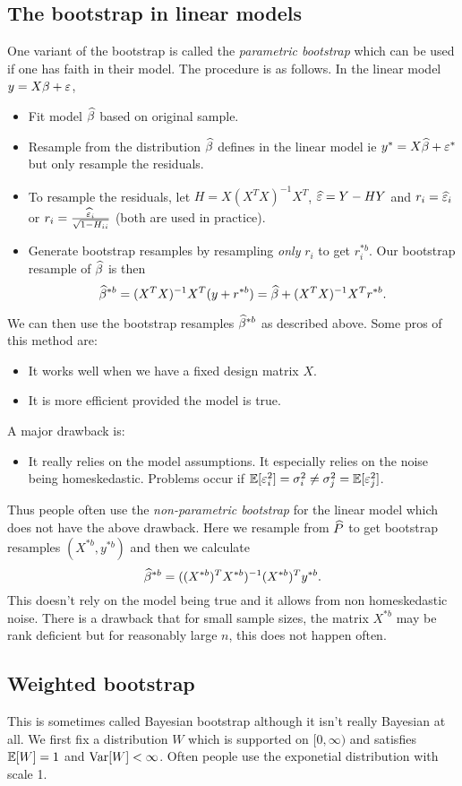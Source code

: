 \subsection{The bootstrap in linear models}
One variant of the bootstrap is called the \emph{parametric bootstrap} which can be used if one has faith in their model. The procedure is as follows. In the linear model $y=X\beta +\varepsilon$,
\begin{itemize}
    \item Fit model $\widehat{\beta}$ based on original sample.
    \item Resample from the distribution $\widehat{\beta}$ defines in the linear model ie $y^* =X\widehat{\beta}+\varepsilon^*$ but only resample the residuals.
    \item To resample the residuals, let $H=X(X^TX)^{-1}X^T$, $\widehat{\varepsilon}=Y-HY$ and $r_i = \widehat{\varepsilon}_i$ or $r_i = \frac{\widehat{\varepsilon}_i}{\sqrt{1-H_{ii}}}$ (both are used in practice). 
    \item Generate bootstrap resamples by resampling \emph{only} $r_i$ to get $r_i^{*b}$. Our bootstrap resample of $\widehat{\beta}$ is then 
    \[\widehat{\beta}^{*b} = (X^TX)^{-1}X^T(y+r^{*b})=\widehat{\beta}+(X^TX)^{-1}X^Tr^{*b}. \]
\end{itemize}
We can then use the bootstrap resamples $\widehat{\beta}^{*b}$ as described above. Some pros of this method are:
\begin{itemize}
    \item It works well when we have a fixed design matrix $X$.
    \item It is more efficient provided the model is true.
\end{itemize}
A major drawback is:
\begin{itemize}
    \item It really relies on the model assumptions. It especially relies on the noise being homeskedastic. Problems occur if ${\mathbb{E}}[\varepsilon_i^2]=\sigma_i^2 \neq \sigma_j^2 = {\mathbb{E}}[\varepsilon_j^2]$.
\end{itemize}
Thus people often use the \emph{non-parametric bootstrap} for the linear model which does not have the above drawback. Here we resample from $\widehat{P}$ to get bootstrap resamples $(X^{*b}, y^{*b})$ and then we calculate
\[\widehat{\beta}^{*b} = ((X^{*b})^TX^{*b})^{-1}(X^{*b})^Ty^{*b}.\]
This doesn't rely on the model being true and it allows from non homeskedastic noise. There is a drawback that for small sample sizes, the matrix $X^{*b}$ may be rank deficient but for reasonably large $n$, this does not happen often.
\subsection{Weighted bootstrap}
This is sometimes called Bayesian bootstrap although it isn't really Bayesian at all. We first fix a distribution $W$ which is supported on $[0,\infty)$ and satisfies ${\mathbb{E}}[W]=1$ and $\operatorname{Var}[W]<\infty$. Often people use the exponetial distribution with scale 1.


